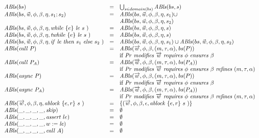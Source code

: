 $$
\begin{array}{lcl}
\Ablocks(bs) & = & \bigcup_{s \in domain(bs)} \Ablocks(bs, s) \\
\Ablocks(bs, \ws, \phi, \beta, \anAction, s_1; s_2) & = &\Ablocks(bs, \ws, \phi, \beta, \anAction, s_1) \cup \\
                                                                                    & &  \Ablocks(bs, \ws, \phi, \beta, \anAction, s_2) \\
 \Ablocks(bs, \ws, \phi, \beta, \anAction, \while{\locExpr}{e}{s} ) & = & \Ablocks(bs,\ws, \phi, \beta, \anAction,  s) \\
\Ablocks(bs, \ws, \phi, \beta, \anAction, \termwhile{\locExpr}{e}{s} ) & = & \Ablocks(bs, \ws, \phi, \beta, \anAction,  s) \\
\Ablocks(bs, \ws, \phi, \beta, \anAction, \ite{\locExpr}{s_1}{s_2}) & = & \Ablocks(bs, \ws, \phi, \beta, \anAction, s_1) \cup
                                                                                                          \Ablocks(bs, \ws, \phi, \beta, \anAction, s_2) \\
\Ablocks(\call{P}) & = & \Ablocks(\overrightarrow{w},  \phi, \beta, (m, \tau, \alpha), \bodies(P) ) \\ 
                          &    & \mbox{if\ } \proc\ \mathit{modifies}\ \overrightarrow{w}\ \mathit{requires}\ \phi\ \mathit{ensures}\ \beta\ \\
\Ablocks(\call{P_{A}}) & = & \Ablocks(\overrightarrow{w},  \phi, \beta, (m, \tau, \alpha), \bodies(P_{A}) ) \\ 
                          &    & \mbox{if\ } \proc\ \mathit{modifies}\ \overrightarrow{w}\ \mathit{requires}\ \phi\ \mathit{ensures}\ \beta\  \mathit{refines}\ (m, \tau, \alpha)\\
\Ablocks(\async{P}) & = & \Ablocks(\overrightarrow{w},  \phi, \beta, (m, \tau, \alpha), \bodies(P) ) \\ 
                          &    & \mbox{if\ } \proc\ \mathit{modifies}\ \overrightarrow{w}\ \mathit{requires}\ \phi\ \mathit{ensures}\ \beta\ \\
\Ablocks(\async{P_{A}}) & = & \Ablocks(\overrightarrow{w},  \phi, \beta, (m, \tau, \alpha), \bodies(P_{A}) ) \\ 
                          &    & \mbox{if\ } \proc\ \mathit{modifies}\ \overrightarrow{w}\ \mathit{requires}\ \phi\ \mathit{ensures}\ \beta\  \mathit{refines}\ (m, \tau, \alpha)\\
\Ablocks(\overrightarrow{w},  \phi, \beta, \anAction,\ablock{e,r}{s}) & = & \{(\overrightarrow{w},  \phi, \beta, \emptyAction, \ablock{e,r}{s}) \} \\ 
\Ablocks(\_, \_, \_, \_, \skipstmt) & = & \emptyset \\
\Ablocks(\_, \_, \_, \_, \assert{le})& = & \emptyset \\
\Ablocks(\_, \_, \_, \_,  w := \locExpr) & = & \emptyset \\
\Ablocks(\_, \_, \_, \_, \call{A}) & = & \emptyset \\
\end{array}
$$

